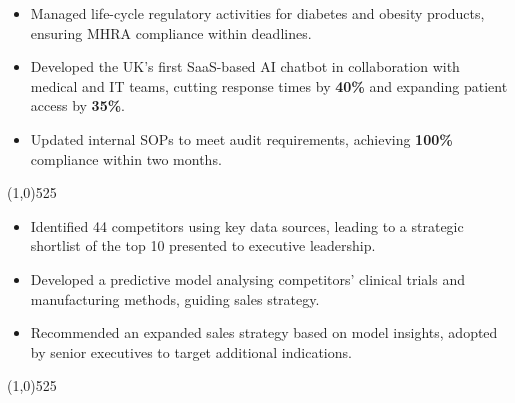 \documentclass[a4paper]{deedy-resume} %
\begin{document}
        \begin{multicols}{2}
            \begin{itemize}
                \item Managed life-cycle regulatory activities for diabetes and obesity products, ensuring MHRA compliance within deadlines.
                \item Developed the UK's first SaaS-based AI chatbot in collaboration with medical and IT teams, cutting response times by \textbf{40\%} and expanding patient access by \textbf{35\%}.
                \item Updated internal SOPs to meet audit requirements, achieving \textbf{100\%} compliance within two months.
            \end{itemize}
        \end{multicols}

\vspace{-10pt}

\begin{center}
    \vspace{-17pt}
    \line(1,0){525}
    \vspace{-11pt}
\end{center}
\vspace{-10pt}
\begin{multicols}{2}
    \begin{itemize}
        \item Identified 44 competitors using key data sources, leading to a strategic shortlist of the top 10 presented to executive leadership.
        \item Developed a predictive model analysing competitors' clinical trials and manufacturing methods, guiding sales strategy.
        \item Recommended an expanded sales strategy based on model insights, adopted by senior executives to target additional indications.
    \end{itemize}
\end{multicols}
\vspace{-5pt}
\begin{center}
    \vspace{-17pt}
    \line(1,0){525}
    \vspace{-11pt}
\end{center}
\end{document}
